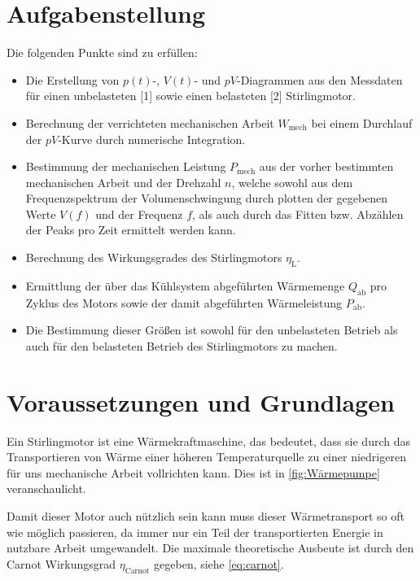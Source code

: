 \documentclass[11pt]{scrartcl}
\begin{document}

\tableofcontents
\newpage
\section{Aufgabenstellung}
\label{sec:aufgabenstellung}

Die folgenden Punkte sind zu erfüllen:
\begin{itemize}
    \item Die Erstellung von $p(t)$-, $V(t)$- und $pV$-Diagrammen aus den Messdaten 
        für einen unbelasteten [1] sowie einen belasteten [2] Stirlingmotor.
    \item Berechnung der verrichteten mechanischen Arbeit $W_{\text{mech}}$ bei einem 
        Durchlauf der $pV$-Kurve durch numerische Integration.
    \item Bestimmung der mechanischen Leistung $P_{\text{mech}}$ aus der vorher 
        bestimmten mechanischen Arbeit und der Drehzahl $n$, welche sowohl
        aus dem Frequenzspektrum der Volumenschwingung durch plotten der
        gegebenen Werte $V(f)$ und der Frequenz $f$,
         als auch durch das Fitten bzw. Abzählen der Peaks pro Zeit ermittelt 
         werden kann.
     \item Berechnung des Wirkungsgrades des Stirlingmotors $\eta_{\text{L}}$.
    \item Ermittlung der über das Kühlsystem abgeführten Wärmemenge 
        $Q_{\text{ab}}$ pro Zyklus des Motors sowie der damit abgeführten
        Wärmeleistung $P_{\text{ab}}$.
    \item Die Bestimmung dieser Größen ist sowohl für den unbelasteten Betrieb
        als auch für den belasteten Betrieb des Stirlingmotors zu machen.
\end{itemize}

\section{Voraussetzungen und Grundlagen}
\label{sec:voraussetzungen_grundlagen}
Ein Stirlingmotor ist eine Wärmekraftmaschine, das bedeutet, dass sie durch
das Transportieren von Wärme einer höheren Temperaturquelle zu einer niedrigeren
für uns mechanische Arbeit vollrichten kann. Dies ist in \autoref{fig:Wärmepumpe}
veranschaulicht.

Damit dieser Motor auch nützlich sein kann muss dieser Wärmetransport so oft wie 
möglich passieren, da immer nur ein Teil der transportierten Energie in
nutzbare Arbeit umgewandelt. Die maximale theoretische Ausbeute ist durch den
Carnot Wirkungsgrad $\eta_{\text{Carnot}}$ gegeben, siehe \autoref{eq:carnot}.
\end{document}
